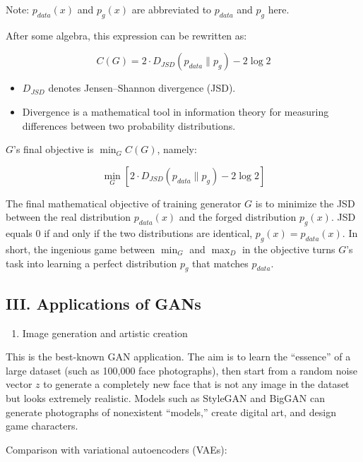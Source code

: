 Note: \(p_{data}(x)\) and \(p_g(x)\) are abbreviated to \(p_{data}\) and \(p_g\) here.

After some algebra, this expression can be rewritten as:

\[
C(G)=2\cdot D_{JSD}(p_{data}\parallel p_g)-2\log 2
\]

\begin{itemize}
\tightlist
\item
  \(D_{JSD}\) denotes Jensen--Shannon divergence (JSD).
\item
  Divergence is a mathematical tool in information theory for measuring differences between two probability distributions.
\end{itemize}

\(G\)'s final objective is \(\min_G C(G)\), namely:

\[
\min_G [2\cdot D_{JSD}(p_{data}\parallel p_g)-2\log 2]
\]

The final mathematical objective of training generator \(G\) is to minimize the JSD between the real distribution \(p_{data}(x)\) and the forged distribution \(p_g(x)\). JSD equals \(0\) if and only if the two distributions are identical, \(p_g(x)=p_{data}(x)\). In short, the ingenious game between \(\min_G\) and \(\max_D\) in the objective turns \(G\)'s task into learning a perfect distribution \(p_g\) that matches \(p_{data}\).

\hypertarget{iii.-applications-of-gans}{%
\subsection{III. Applications of GANs}\label{iii.-applications-of-gans}}

\begin{enumerate}
\def\labelenumi{\arabic{enumi}.}
\tightlist
\item
  Image generation and artistic creation
\end{enumerate}

This is the best-known GAN application. The aim is to learn the ``essence'' of a large dataset (such as 100,000 face photographs), then start from a random noise vector \(z\) to generate a completely new face that is not any image in the dataset but looks extremely realistic. Models such as StyleGAN and BigGAN can generate photographs of nonexistent ``models,'' create digital art, and design game characters.

Comparison with variational autoencoders (VAEs):

